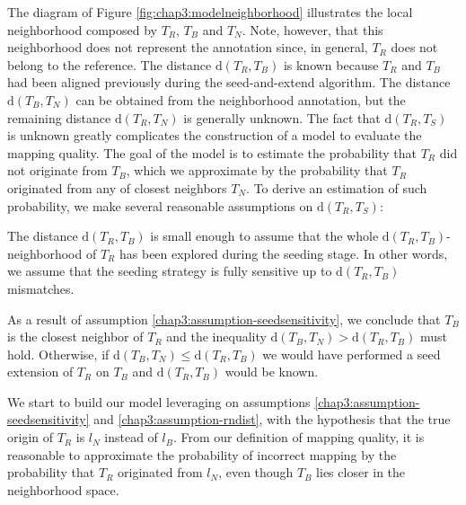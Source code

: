 The diagram of Figure \ref{fig:chap3:modelneighborhood} illustrates the local neighborhood
composed by $T_R$, $T_B$ and $T_N$. Note, however, that this
neighborhood does not represent the annotation since, in general,
$T_R$ does not belong to the reference. The distance
$\mathrm{d}(T_R,T_B)$ is known because $T_R$ and $T_B$ had been
aligned previously during the seed-and-extend algorithm. The
distance $\mathrm{d}(T_B,T_N)$ can be obtained from the neighborhood
annotation, but the remaining distance $\mathrm{d}(T_R,T_N)$ is
generally unknown. The fact that $\mathrm{d}(T_R,T_S)$ is unknown greatly
complicates the construction of a model to evaluate the mapping
quality. The goal of the model is to estimate the probability that
$T_R$ did not originate from $T_B$, which we approximate by the
probability that $T_R$ originated from any of closest neighbors
$T_N$. To derive an estimation of such probability, we make several
reasonable assumptions on $\mathrm{d}(T_R,T_S)$: 
\begin{assumption}
  \label{chap3:assumption-seedsensitivity}
  The distance $\mathrm{d}(T_R,T_B)$ is small enough to assume
  that the whole $\mathrm{d}(T_R,T_B)$-neighborhood of $T_R$ has
  been explored during the seeding stage. In other words, we assume
  that the seeding strategy is fully sensitive up to
  $\mathrm{d}(T_R,T_B)$ mismatches.
\end{assumption}
\begin{assumption}
  \label{chap3:assumption-rndist}
  As a result of assumption \ref{chap3:assumption-seedsensitivity}, we
  conclude that $T_B$ is the closest neighbor of $T_R$ and the
  inequality $\mathrm{d}(T_B,T_N) > \mathrm{d}(T_R,T_B)$ must
  hold. Otherwise, if $\mathrm{d}(T_B,T_N) \le \mathrm{d}(T_R,T_B)$
  we would have performed a seed extension of $T_R$ on $T_B$ and
  $\mathrm{d}(T_R,T_B)$ would be known.
\end{assumption}

We start to build our model leveraging on assumptions
\ref{chap3:assumption-seedsensitivity} and
\ref{chap3:assumption-rndist}, with the hypothesis that the true
origin of $T_R$ is $l_N$ instead of $l_B$. From our definition of
mapping quality, it is reasonable to approximate the probability of
incorrect mapping by the probability that $T_R$ originated from $l_N$,
even though $T_B$ lies closer in the neighborhood space.

